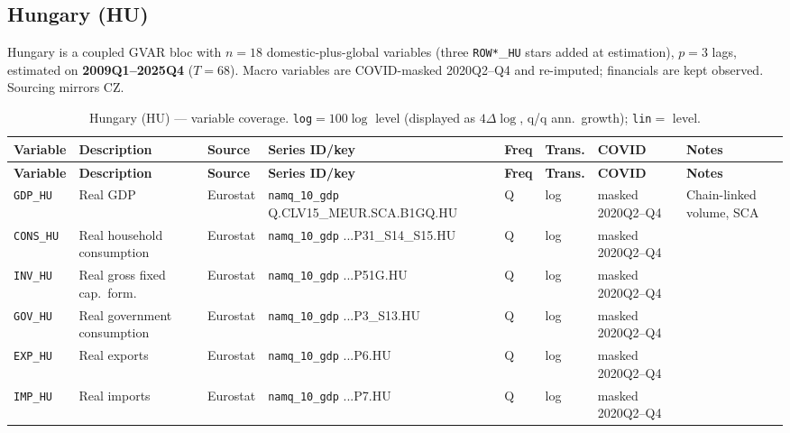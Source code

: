 \subsection{Hungary (HU)}\label{sec:data:HU}
Hungary is a coupled GVAR bloc with $n=18$ domestic-plus-global
variables (three \texttt{ROW*}\_\texttt{HU} stars added at estimation),
$p=3$ lags, estimated on \textbf{2009Q1--2025Q4} ($T=68$).  Macro
variables are COVID-masked 2020Q2--Q4 and re-imputed; financials are kept
observed.  Sourcing mirrors CZ.

{\footnotesize
\begin{longtable}{@{}p{2.0cm}p{2.7cm}p{1.4cm}p{2.8cm}p{0.7cm}p{0.85cm}p{1.5cm}p{2.3cm}@{}}
\caption{Hungary (HU) --- variable coverage.  \texttt{log}$=100\log$ level
(displayed as $4\Delta\log$, q/q ann.\ growth); \texttt{lin}$=$ level.}
\label{tab:data:HU}\\
\toprule
\textbf{Variable} & \textbf{Description} & \textbf{Source} & \textbf{Series ID/key} & \textbf{Freq} & \textbf{Trans.} & \textbf{COVID} & \textbf{Notes} \\
\midrule \endfirsthead
\toprule
\textbf{Variable} & \textbf{Description} & \textbf{Source} & \textbf{Series ID/key} & \textbf{Freq} & \textbf{Trans.} & \textbf{COVID} & \textbf{Notes} \\
\midrule \endhead
\bottomrule \endfoot
\texttt{GDP\_HU}    & Real GDP                      & Eurostat & \texttt{namq\_10\_gdp} Q.\allowbreak CLV15\_MEUR.\allowbreak SCA.\allowbreak B1GQ.\allowbreak HU        & Q & log & masked 2020Q2--Q4 & Chain-linked volume, SCA \\
\texttt{CONS\_HU}   & Real household consumption    & Eurostat & \texttt{namq\_10\_gdp} ...P31\_S14\_S15.HU              & Q & log & masked 2020Q2--Q4 & \\
\texttt{INV\_HU}    & Real gross fixed cap.\ form.  & Eurostat & \texttt{namq\_10\_gdp} ...P51G.HU                       & Q & log & masked 2020Q2--Q4 & \\
\texttt{GOV\_HU}    & Real government consumption   & Eurostat & \texttt{namq\_10\_gdp} ...P3\_S13.HU                    & Q & log & masked 2020Q2--Q4 & \\
\texttt{EXP\_HU}    & Real exports                  & Eurostat & \texttt{namq\_10\_gdp} ...P6.HU                         & Q & log & masked 2020Q2--Q4 & \\
\texttt{IMP\_HU}    & Real imports                  & Eurostat & \texttt{namq\_10\_gdp} ...P7.HU                         & Q & log & masked 2020Q2--Q4 & \\

\end{longtable}}
